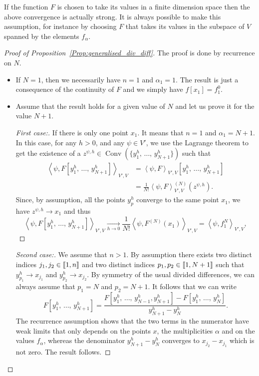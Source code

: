 \documentclass[AHL,Unicode,longabstracts]{cedram}
\DeclareMathOperator{\Conv}{Conv}
\newenvironment{step}[1]{\begin{proof}[#1]}{\let\qed\relax\end{proof}}
\newcommand{\llbracket}{\mathopen{[\mkern -2.7mu[}}
\newcommand{\rrbracket}{\mathclose{]\mkern -2.7mu]}}
\newcommand{\inter}[2]{\llbracket #1,#2 \rrbracket}
\newcommand{\dualV}[2]{\left\langle #1, #2 \right\rangle_{V',V}}
\begin{document}
\begin{rema}
If the function $F$ is chosen to take its values in a finite dimension space then the above convergence is actually strong. It is always possible to make this assumption, for instance by choosing $F$ that takes its values in the subspace of $V$ spanned by the elements $f_\alpha$.
\end{rema}

\begin{proof}[Proof of Proposition~\ref{Prop:generalised_div_diff}]
The proof is done by recurrence on $N$.
\begin{itemize}
\item If $N=1$, then we necessarily have $n=1$ and $\alpha_1=1$. The result is just a consequence of the continuity of $F$ and we simply have $f[x_1]=f_1^0$.

\item Assume that the result holds for a given value of $N$ and let us prove it for the value $N+1$.
\begin{step}{First case:}
If there is only one point $x_1$. It means that $n=1$ and $\alpha_1=N+1$. In this case, for any $h>0$, and any $\psi\in V'$, we use the Lagrange theorem to get the existence of a $z^{\psi,h}\in \Conv(\{y_1^h,\,\dotsc,\,y_{N+1}^h\})$ such that
\begin{align*}
\dualV{\psi}{F[y_1^h,\,\dotsc,\,y_{N+1}^h]} & = \dualV{\psi}{F}[y_1^h,\,\dotsc,\,y_{N+1}^h]
\\
& = \frac{1}{N!} \dualV{\psi}{F}^{(N)}(z^{\psi,h}).
\end{align*}
Since, by assumption, all the points $y_p^h$ converge to the same point $x_1$, we have $z^{\psi,h}\to x_1$ and thus
\[
\dualV{\psi}{F[y_1^h,\,\dotsc,\,y_{N+1}^h]} \xrightarrow[h\to 0]{} \frac{1}{N!} \dualV{\psi}{F^{(N)}(x_1)} = \dualV{\psi}{f_1^N},
\]
\end{step}
\begin{step}{Second case:}
We assume that $n>1$. By assumption there exists two distinct indices $j_1, j_2\in \inter{1}{n}$ and two distinct indices $p_1,p_2\in \inter{1}{N+1}$ such that $y_{p_1}^h \to x_{j_1}$ and $y_{p_2}^h\to x_{j_2}$. By symmetry of the usual divided differences, we can always assume that $p_1=N$ and $p_2=N+1$. It follows that we can write
\[
F\left[y_1^h,\,\dotsc,\,y_{N+1}^h\right] = \frac{ F\left[y_1^h,\,\dotsc,\,y_{N-1}^h,y_{N+1}^h\right] - F\left[y_1^h,\,\dotsc,\,y_{N}^h\right]}{y_{N+1}^h - y_N^h}.
\]
The recurrence assumption shows that the two terms in the numerator have weak limits that only depends on the points $x$, the multiplicities $\alpha$ and on the values $f_\alpha$, whereas the denominator $y_{N+1}^h - y_N^h$ converges to $x_{j_2}-x_{j_1}$ which is not zero. The result follows.
\end{step}
\end{itemize}
\end{proof}
\end{document}
